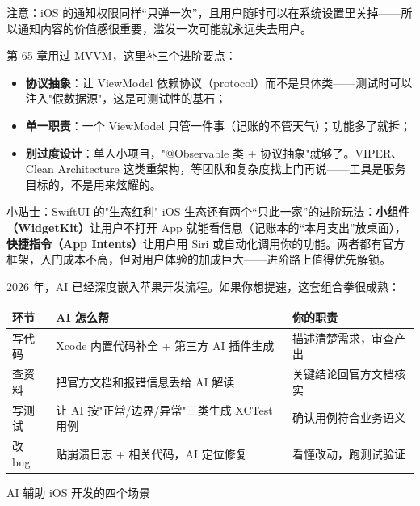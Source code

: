注意：iOS 的通知权限同样“只弹一次”，且用户随时可以在系统设置里关掉——所以通知内容的价值感很重要，滥发一次可能就永远失去用户。


第 65 章用过 MVVM，这里补三个进阶要点：

\begin{itemize}
  \item \textbf{协议抽象}：让 ViewModel 依赖协议（protocol）而不是具体类——测试时可以注入"假数据源"，这是可测试性的基石；
  \item \textbf{单一职责}：一个 ViewModel 只管一件事（记账的不管天气）；功能多了就拆；
  \item \textbf{别过度设计}：单人小项目，"@Observable 类 + 协议抽象"就够了。VIPER、Clean Architecture 这类重架构，等团队和复杂度找上门再说——工具是服务目标的，不是用来炫耀的。
\end{itemize}

\begin{tcbinfo}{小贴士：SwiftUI 的"生态红利"}
iOS 生态还有两个“只此一家”的进阶玩法：\textbf{小组件（WidgetKit）}让用户不打开 App 就能看信息（记账本的“本月支出”放桌面），\textbf{快捷指令（App Intents）}让用户用 Siri 或自动化调用你的功能。两者都有官方框架，入门成本不高，但对用户体验的加成巨大——进阶路上值得优先解锁。

\end{tcbinfo}


2026 年，AI 已经深度嵌入苹果开发流程。如果你想提速，这套组合拳很成熟：

\begin{center}
\begin{tabularx}{\linewidth}{|X|X|X|}
\hline
\textbf{环节} & \textbf{AI 怎么帮} & \textbf{你的职责} \tabularnewline
\hline
写代码 & Xcode 内置代码补全 + 第三方 AI 插件生成 & 描述清楚需求，审查产出 \tabularnewline
查资料 & 把官方文档和报错信息丢给 AI 解读 & 关键结论回官方文档核实 \tabularnewline
写测试 & 让 AI 按"正常/边界/异常"三类生成 XCTest 用例 & 确认用例符合业务语义 \tabularnewline
改 bug & 贴崩溃日志 + 相关代码，AI 定位修复 & 看懂改动，跑测试验证 \tabularnewline
\hline
\end{tabularx}
\end{center}

\begin{center}\small\color{gray}AI 辅助 iOS 开发的四个场景\end{center}

